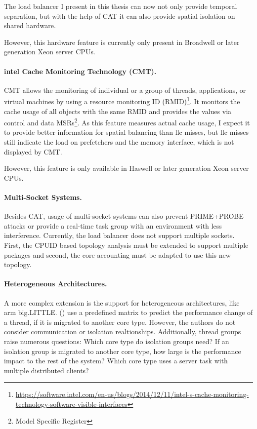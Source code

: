 The load balancer I present in  this thesis can now not only provide temporal
separation, but with the help of CAT it can also provide spatial isolation on
shared hardware.

However, this hardware feature is currently only present in Broadwell or later
generation Xeon\texttrademark{} server CPUs.

\paragraph{\gls{intel} Cache Monitoring Technology (CMT).}
CMT allows the monitoring of individual or a group of threads, applications, or
virtual machines by using a resource monitoring ID (RMID)\footnote{
  \url{https://software.intel.com/en-us/blogs/2014/12/11/intel-s-cache-monitoring-technology-software-visible-interfaces}}.
It monitors the cache usage of all objects with the same RMID and provides
the values via control and data MSRs\footnote{Model Specific Register}.
As this feature measures actual cache usage, I expect it to provide better
information for spatial balancing than \gls{llc} misses, but \gls{llc} misses still
indicate the load on prefetchers and the memory interface, which is not
displayed by CMT.

However, this feature is only available in Haswell or later generation
Xeon\texttrademark{} server CPUs.

\paragraph{Multi-Socket Systems.}
Besides CAT, usage of multi-socket systems can also prevent PRIME+PROBE attacks
or provide a real-time task group with an environment with less interference.
Currently, the load balancer does not support multiple sockets.
First, the CPUID based topology analysis must be extended to support multiple
packages and second, the core accounting must be adapted to use this new
topology.

\paragraph{Heterogeneous Architectures.}
A more complex extension is the support for heterogeneous architectures, like
\gls{arm} big.LITTLE.
\citeauthor{sarma_smartbalance_2015} (\cite{sarma_smartbalance_2015}) use a
predefined matrix to predict the performance change of a thread,
if it is migrated to another core type.
However, the authors do not consider communication or isolation realtionships.
Additionally, thread groups raise numerous questions: Which core type do isolation groups
need?
If an isolation group is migrated to another core type, how large is the
performance  impact to the rest of the system?
Which core type uses a server task with multiple distributed clients?

